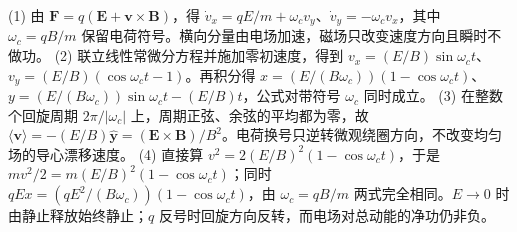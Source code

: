 (1) 由 \(\mathbf F=q(\mathbf E+\mathbf v\times\mathbf B)\)，得 \(\dot v_x=qE/m+\omega_c v_y\)、\(\dot v_y=-\omega_c v_x\)，其中 \(\omega_c=qB/m\) 保留电荷符号。横向分量由电场加速，磁场只改变速度方向且瞬时不做功。
(2) 联立线性常微分方程并施加零初速度，得到 \(v_x=(E/B)\sin\omega_ct\)、\(v_y=(E/B)(\cos\omega_ct-1)\)。再积分得 \(x=(E/(B\omega_c))(1-\cos\omega_ct)\)、\(y=(E/(B\omega_c))\sin\omega_ct-(E/B)t\)，公式对带符号 \(\omega_c\) 同时成立。
(3) 在整数个回旋周期 \(2\pi/|\omega_c|\) 上，周期正弦、余弦的平均都为零，故 \(\langle\mathbf v\rangle=-(E/B)\hat{\mathbf y}=(\mathbf E\times\mathbf B)/B^2\)。电荷换号只逆转微观绕圈方向，不改变均匀场的导心漂移速度。
(4) 直接算 \(v^2=2(E/B)^2(1-\cos\omega_ct)\)，于是 \(m v^2/2=m(E/B)^2(1-\cos\omega_ct)\)；同时 \(qEx=(qE^2/(B\omega_c))(1-\cos\omega_ct)\)，由 \(\omega_c=qB/m\) 两式完全相同。\(E\to0\) 时由静止释放始终静止；\(q\) 反号时回旋方向反转，而电场对总动能的净功仍非负。
